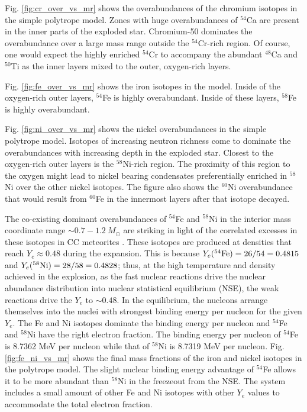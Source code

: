 \documentclass[preprint]{revtex4-2}
\begin{document}
Fig. \ref{fig:cr_over_vs_mr} shows the overabundances of the chromium isotopes
in the simple polytrope model.
Zones with huge overabundances of $^{54}$Ca are present in the
inner parts of the exploded star.  Chromium-50 dominates the overabundance
over a large mass range outside the $^{54}$Cr-rich region.  Of course,
one would expect the highly enriched $^{54}$Cr to accompany the 
abundant $^{48}$Ca and $^{50}$Ti as the inner layers mixed to the outer,
oxygen-rich layers.

Fig. \ref{fig:fe_over_vs_mr} shows the iron isotopes in the model.
Inside of the oxygen-rich outer layers, $^{54}$Fe is
highly overabundant.  Inside of these layers, $^{58}$Fe is highly
overabundant.

Fig. \ref{fig:ni_over_vs_mr} shows the nickel overabundances in the
simple polytrope model.
Isotopes of increasing neutron richness come to dominate
the overabundances with increasing depth in the exploded star.  Closest
to the oxygen-rich outer layers is the $^{58}$Ni-rich region.  The proximity
of this region to the oxygen might lead to nickel bearing condensates
preferentially enriched in $^{58}$Ni over the other nickel isotopes.
The figure also shows the $^{60}$Ni overabundance that would result from
$^{60}$Fe in the innermost layers after that isotope decayed.

The co-existing dominant overabundances of $^{54}$Fe and $^{58}$Ni
in the interior mass coordinate range $\sim 0.7 - 1.2\ M_\odot$ are
striking in light of the correlated excesses in these isotopes
in CC meteorites
\cite{Hopp2021}.  These isotopes are produced at densities that reach
$Y_e \approx 0.48$ during the expansion.  This is because
$Y_e(^{54}{\rm Fe}) = 26 / 54 = 0.4815$ 
and
$Y_e(^{58}{\rm Ni}) = 28 / 58 = 0.4828$; thus, at the high temperature
and density achieved in the explosion, as the fast nuclear reactions
drive the nuclear abundance distribution into nuclear statistical equilibrium
(NSE),
the weak reactions drive the $Y_e$ to $\sim 0.48$. In the equilibrium,
the nucleons arrange
themselves into the nuclei with strongest binding energy per nucleon for
the given $Y_e$.  The Fe and Ni isotopes dominate the binding energy per nucleon
and $^{54}$Fe and $^{58}$Ni have the right electron fraction.  The binding
energy per nucleon of $^{54}$Fe is 8.7362 MeV per nucleon while that of
$^{58}$Ni is 8.7319 MeV per nucleon.  Fig. \ref{fig:fe_ni_vs_mr}
shows the final mass fractions of the iron and nickel isotopes in the
polytrope model.  The slight nuclear binding energy
advantage of $^{54}$Fe allows it to be more abundant than $^{58}$Ni in
the freezeout from the NSE.  The system includes a small amount of other
Fe and Ni isotopes with other $Y_e$ values
to accommodate the total electron fraction.
\end{document}
